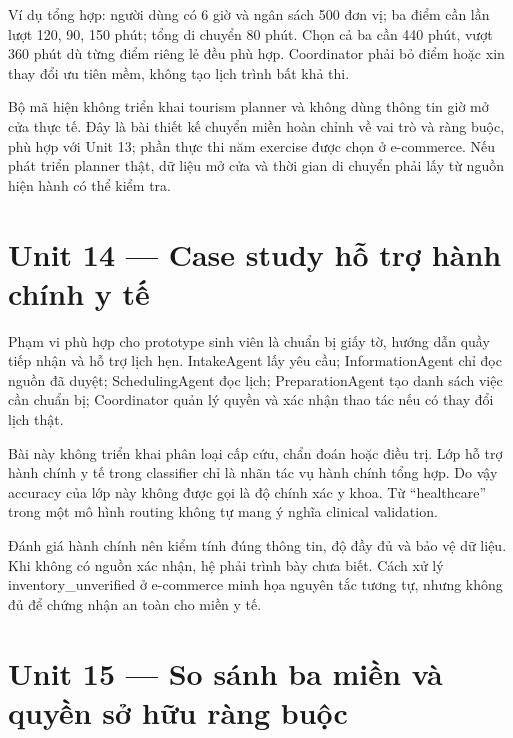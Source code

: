Ví dụ tổng hợp: người dùng có 6 giờ và ngân sách 500 đơn vị; ba điểm cần
lần lượt 120, 90, 150 phút; tổng di chuyển 80 phút. Chọn cả ba cần 440
phút, vượt 360 phút dù từng điểm riêng lẻ đều phù hợp. Coordinator phải
bỏ điểm hoặc xin thay đổi ưu tiên mềm, không tạo lịch trình bất khả thi.

Bộ mã hiện không triển khai tourism planner và không dùng thông tin giờ
mở cửa thực tế. Đây là bài thiết kế chuyển miền hoàn chỉnh về vai trò và
ràng buộc, phù hợp với Unit 13; phần thực thi năm exercise được chọn ở
e-commerce. Nếu phát triển planner thật, dữ liệu mở cửa và thời gian di
chuyển phải lấy từ nguồn hiện hành có thể kiểm tra.

\section{Unit 14 --- Case study hỗ trợ hành chính y
tế}\label{unit-14-case-study-hux1ed7-trux1ee3-huxe0nh-chuxednh-y-tux1ebf}

Phạm vi phù hợp cho prototype sinh viên là chuẩn bị giấy tờ, hướng dẫn
quầy tiếp nhận và hỗ trợ lịch hẹn. IntakeAgent lấy yêu cầu;
InformationAgent chỉ đọc nguồn đã duyệt; SchedulingAgent đọc lịch;
PreparationAgent tạo danh sách việc cần chuẩn bị; Coordinator quản lý
quyền và xác nhận thao tác nếu có thay đổi lịch thật.

Bài này không triển khai phân loại cấp cứu, chẩn đoán hoặc điều trị. Lớp
hỗ trợ hành chính y tế trong classifier chỉ là nhãn tác vụ hành chính
tổng hợp. Do vậy accuracy của lớp này không được gọi là độ chính xác y
khoa. Từ ``healthcare'' trong một mô hình routing không tự mang ý nghĩa
clinical validation.

Đánh giá hành chính nên kiểm tính đúng thông tin, độ đầy đủ và bảo vệ dữ
liệu. Khi không có nguồn xác nhận, hệ phải trình bày chưa biết. Cách xử
lý inventory\_unverified ở e-commerce minh họa nguyên tắc tương tự,
nhưng không đủ để chứng nhận an toàn cho miền y tế.

\section{Unit 15 --- So sánh ba miền và quyền sở hữu ràng
buộc}\label{unit-15-so-suxe1nh-ba-miux1ec1n-vuxe0-quyux1ec1n-sux1edf-hux1eefu-ruxe0ng-buux1ed9c}

